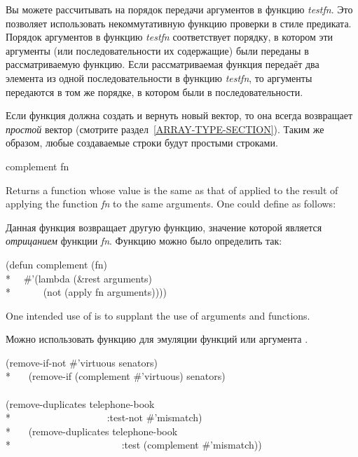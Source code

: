 Вы можете рассчитывать на порядок передачи аргументов в функцию \emph{testfn}.
Это позволяет использовать некоммутативную функцию проверки в стиле предиката.
Порядок аргументов в функцию \emph{testfn} соответствует порядку, в котором эти
аргументы (или последовательности их содержащие) были переданы в рассматриваемую
функцию.
Если рассматриваемая функция передаёт два элемента из одной последовательности в
функцию \emph{testfn}, то аргументы передаются в том же порядке, в котором были
в последовательности.

Если функция должна создать и вернуть новый вектор, то она всегда возвращает
\emph{простой} вектор (смотрите раздел~\ref{ARRAY-TYPE-SECTION}).
Таким же образом, любые создаваемые строки будут простыми строками.

\begin{defun}[Function]
complement fn

Returns a function whose value is the same as that of 
applied to the result of applying the function \emph{fn} to the same
arguments.  One could define  as follows:

Данная функция возвращает другую функцию, значение которой является
\emph{отрицанием} функции \emph{fn}. Функцию  можно было
определить так:
\begin{lisp}
(defun complement (fn) \\*
~~\#'(lambda (\&rest arguments) \\*
~~~~~~(not (apply fn arguments))))
\end{lisp}

One intended use of  is to supplant the use of
 arguments and  functions.

Можно использовать функцию  для эмуляции  функций
или аргумента .
\begin{lisp}
(remove-if-not \#'virtuous senators) {\EQ} \\*
~~~(remove-if (complement \#'virtuous) senators) \\
\\
(remove-duplicates telephone-book \\*
~~~~~~~~~~~~~~~~~~~:test-not \#'mismatch) {\EQ} \\*
~~~(remove-duplicates telephone-book \\*
~~~~~~~~~~~~~~~~~~~~~~:test (complement \#'mismatch))
\end{lisp}
\end{defun}

